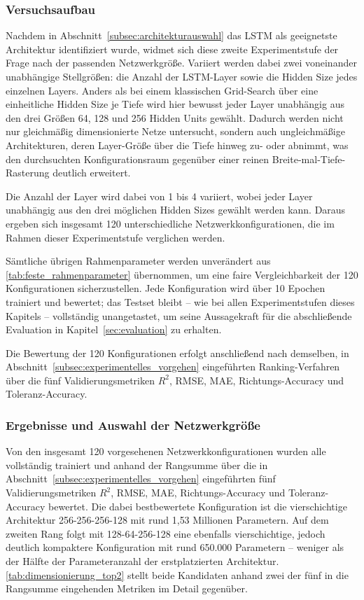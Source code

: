 \subsubsection{Versuchsaufbau}
\label{subsubsec:dimensionierung_sweep}

Nachdem in Abschnitt~\ref{subsec:architekturauswahl} das \gls{LSTM} als geeignetste Architektur identifiziert wurde, widmet sich diese zweite Experimentstufe der Frage nach der passenden Netzwerkgröße. Variiert werden dabei zwei voneinander unabhängige Stellgrößen: die Anzahl der \gls{LSTM}-Layer sowie die Hidden Size jedes einzelnen Layers. Anders als bei einem klassischen Grid-Search über eine einheitliche Hidden Size je Tiefe wird hier bewusst jeder Layer unabhängig aus den drei Größen 64, 128 und 256 Hidden Units gewählt. Dadurch werden nicht nur gleichmäßig dimensionierte Netze untersucht, sondern auch ungleichmäßige Architekturen, deren Layer-Größe über die Tiefe hinweg zu- oder abnimmt, was den durchsuchten Konfigurationsraum gegenüber einer reinen Breite-mal-Tiefe-Rasterung deutlich erweitert.

Die Anzahl der Layer wird dabei von 1 bis 4 variiert, wobei jeder Layer unabhängig aus den drei möglichen Hidden Sizes gewählt werden kann. Daraus ergeben sich insgesamt 120 unterschiedliche Netzwerkkonfigurationen, die im Rahmen dieser Experimentstufe verglichen werden.

Sämtliche übrigen Rahmenparameter werden unverändert aus \autoref{tab:feste_rahmenparameter} übernommen, um eine faire Vergleichbarkeit der 120 Konfigurationen sicherzustellen. Jede Konfiguration wird über 10 Epochen trainiert und bewertet; das Testset bleibt -- wie bei allen Experimentstufen dieses Kapitels -- vollständig unangetastet, um seine Aussagekraft für die abschließende Evaluation in Kapitel~\ref{sec:evaluation} zu erhalten.

Die Bewertung der 120 Konfigurationen erfolgt anschließend nach demselben, in Abschnitt~\ref{subsec:experimentelles_vorgehen} eingeführten Ranking-Verfahren über die fünf Validierungsmetriken $R^2$, \gls{RMSE}, \gls{MAE}, Richtungs-Accuracy und Toleranz-Accuracy.

\subsubsection{Ergebnisse und Auswahl der Netzwerkgröße}
\label{subsubsec:dimensionierung_ergebnisse}

Von den insgesamt 120 vorgesehenen Netzwerkkonfigurationen wurden alle vollständig trainiert und anhand der Rangsumme über die in Abschnitt~\ref{subsec:experimentelles_vorgehen} eingeführten fünf Validierungsmetriken $R^2$, \gls{RMSE}, \gls{MAE}, Richtungs-Accuracy und Toleranz-Accuracy bewertet. Die dabei bestbewertete Konfiguration ist die vierschichtige Architektur 256-256-256-128 mit rund 1,53 Millionen Parametern. Auf dem zweiten Rang folgt mit 128-64-256-128 eine ebenfalls vierschichtige, jedoch deutlich kompaktere Konfiguration mit rund 650.000 Parametern -- weniger als der Hälfte der Parameteranzahl der erstplatzierten Architektur. \autoref{tab:dimensionierung_top2} stellt beide Kandidaten anhand zwei der fünf in die Rangsumme eingehenden Metriken im Detail gegenüber.

